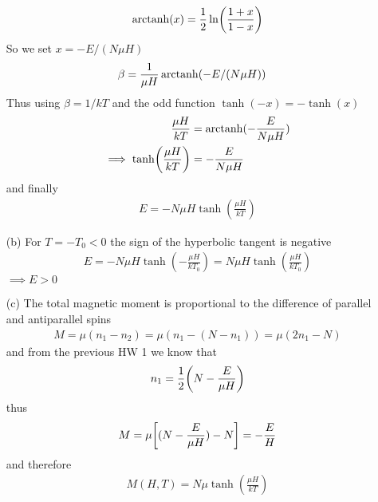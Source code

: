 \documentclass[../main.tex]{subfiles}
\begin{document}
\begin{itemize}
\begin{align*}
        \operatorname{arctanh}(x) = \frac{1}{2} \ln(\frac{1 + x}{1 - x})
    \end{align*}
    So we set $x = -E/(N\mu H)$
    \begin{align*}
        \beta &= \frac{1}{\mu H} \operatorname{arctanh}(-E/(N\mu H)) 
    \end{align*}
    Thus using $\beta = 1/kT$ and the odd function $\tanh(-x) = -\tanh(x)$
    \begin{align*}
        \frac{\mu H}{kT} &= \operatorname{arctanh}(-\frac{E}{N\mu H}) \\
        \implies \tanh(\frac{\mu H}{kT}) &= -\frac{E}{N\mu H}
    \end{align*}
    and finally
    \begin{align*}
        \boxed{
            E = -N\mu H \tanh(\frac{\mu H}{kT})
        }
    \end{align*}
    \item [(b)] For $T = -T_0 < 0$ the sign of the hyperbolic tangent is negative
    \begin{align*}
        E = -N \mu H \tanh(-\frac{\mu H}{kT_0}) = N \mu H \tanh(\frac{\mu H}{kT_0})
    \end{align*}
    $\implies \boxed{E > 0}$
    \item [(c)] The total magnetic moment is proportional to the difference of parallel and antiparallel spins
    \begin{align*}
        M = \mu(n_1 - n_2) = \mu (n_1 - (N - n_1)) = \mu (2n_1 - N)
    \end{align*}
    and from the previous HW 1 we know that
    \begin{align*}
        n_1 = \frac{1}{2} \qt(N - \frac{E}{\mu H}) 
    \end{align*}
    thus
    \begin{align*}
        M = \mu \qt[(N - \frac{E}{\mu H}) - N] = -\frac{E}{H} 
    \end{align*}
    and therefore
    \begin{align*}
        \boxed{
            M (H, T) = N \mu \tanh(\frac{\mu H}{kT})
        }
    \end{align*}
\end{itemize}

\newpage
\end{document}
